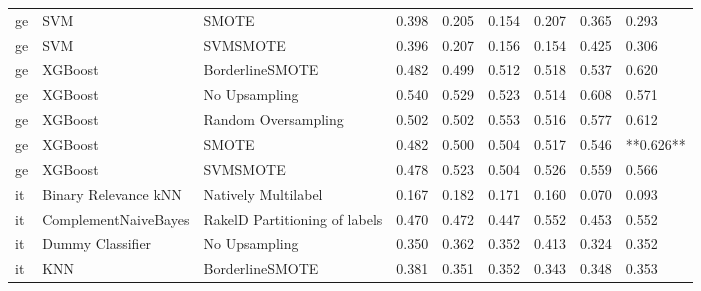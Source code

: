 \begin{tabular}{lllllllll}
      ge &                             SVM &                         SMOTE & 0.398 &                     0.205 &                 0.154 &                  0.207 &                                   0.365 &     0.293 \\
      ge &                             SVM &                      SVMSMOTE & 0.396 &                     0.207 &                 0.156 &                  0.154 &                                   0.425 &     0.306 \\
      ge &                         XGBoost &               BorderlineSMOTE & 0.482 &                     0.499 &                 0.512 &                  0.518 &                                   0.537 &     0.620 \\
      ge &                         XGBoost &                 No Upsampling & 0.540 &                     0.529 &                 0.523 &                  0.514 &                                   0.608 &     0.571 \\
      ge &                         XGBoost &           Random Oversampling & 0.502 &                     0.502 &                 0.553 &                  0.516 &                                   0.577 &     0.612 \\
      ge &                         XGBoost &                         SMOTE & 0.482 &                     0.500 &                 0.504 &                  0.517 &                                   0.546 & **0.626** \\
      ge &                         XGBoost &                      SVMSMOTE & 0.478 &                     0.523 &                 0.504 &                  0.526 &                                   0.559 &     0.566 \\
      it &            Binary Relevance kNN &           Natively Multilabel & 0.167 &                     0.182 &                 0.171 &                  0.160 &                                   0.070 &     0.093 \\
      it &            ComplementNaiveBayes & RakelD Partitioning of labels & 0.470 &                     0.472 &                 0.447 &                  0.552 &                                   0.453 &     0.552 \\
      it &                Dummy Classifier &                 No Upsampling & 0.350 &                     0.362 &                 0.352 &                  0.413 &                                   0.324 &     0.352 \\
      it &                             KNN &               BorderlineSMOTE & 0.381 &                     0.351 &                 0.352 &                  0.343 &                                   0.348 &     0.353 \\

\end{tabular}
